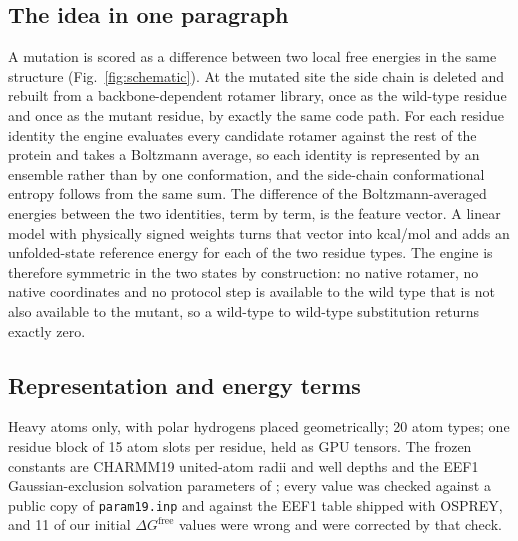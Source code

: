 \documentclass[unnumsec,webpdf,contemporary,large]{oup-authoring-template}
\begin{document}
\subsection{The idea in one paragraph}

A mutation is scored as a difference between two local free energies in the same structure
(Fig.~\ref{fig:schematic}). At the mutated site the side chain is deleted and rebuilt from a backbone-dependent
rotamer library, once as the wild-type residue and once as the mutant residue, by exactly the same code path. For
each residue identity the engine evaluates every candidate rotamer against the rest of the protein and takes a
Boltzmann average, so each identity is represented by an ensemble rather than by one conformation, and the
side-chain conformational entropy follows from the same sum. The difference of the Boltzmann-averaged energies
between the two identities, term by term, is the feature vector. A linear model with physically signed weights
turns that vector into kcal/mol and adds an unfolded-state reference energy for each of the two residue types.
The engine is therefore symmetric in the two states by construction: no native rotamer, no native coordinates and
no protocol step is available to the wild type that is not also available to the mutant, so a wild-type to
wild-type substitution returns exactly zero.

\subsection{Representation and energy terms}

Heavy atoms only, with polar hydrogens placed geometrically; 20 atom types; one residue block of 15 atom slots
per residue, held as GPU tensors. The frozen constants are CHARMM19 united-atom radii and well depths
\citep{brooks1983,neria1996} and the EEF1 Gaussian-exclusion solvation parameters of
\citet{lazaridis1999}; every value was checked against a public copy of \texttt{param19.inp} and against the
EEF1 table shipped with OSPREY, and 11 of our initial $\Delta G^{\mathrm{free}}$ values were wrong and were
corrected by that check.
\end{document}
